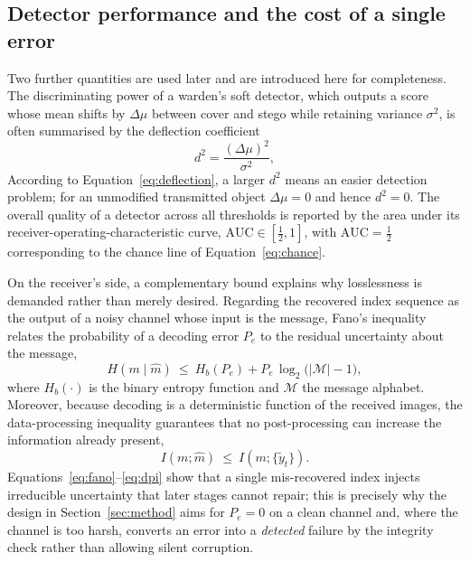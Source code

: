 \documentclass[11pt]{article}
\theoremstyle{definition}
\newcommand{\Eqn}[1]{Equation~\eqref{#1}}
\begin{document}
\subsection{Detector performance and the cost of a single error}\label{sec:detector}
Two further quantities are used later and are introduced here for completeness. The
discriminating power of a warden's soft detector, which outputs a score whose mean
shifts by $\Delta\mu$ between cover and stego while retaining variance $\sigma^2$,
is often summarised by the deflection coefficient
\begin{equation}
  d^2=\frac{(\Delta\mu)^2}{\sigma^2},
  \label{eq:deflection}
\end{equation}
According to \Eqn{eq:deflection}, a larger $d^2$ means an easier detection problem;
for an unmodified transmitted
object $\Delta\mu=0$ and hence $d^2=0$. The overall quality of a detector across all
thresholds is reported by the area under its receiver-operating-characteristic
curve, $\mathrm{AUC}\in[\tfrac12,1]$, with $\mathrm{AUC}=\tfrac12$ corresponding to
the chance line of \Eqn{eq:chance}.

On the receiver's side, a complementary bound explains why losslessness is
demanded rather than merely desired. Regarding the recovered index sequence as the
output of a noisy channel whose input is the message, Fano's inequality relates the
probability of a decoding error $P_e$ to the residual uncertainty about the message,
\begin{equation}
  H\!\left(m \mid \hat m\right)\ \le\ H_b(P_e)+P_e\,\log_2\!\bigl(|\mathcal{M}|-1\bigr),
  \label{eq:fano}
\end{equation}
where $H_b(\cdot)$ is the binary entropy function and $\mathcal{M}$ the message
alphabet. Moreover, because decoding is a deterministic function of the received
images, the data-processing inequality guarantees that no post-processing can
increase the information already present,
\begin{equation}
  I\!\left(m;\hat m\right)\ \le\ I\!\left(m;\{\tilde y_t\}\right).
  \label{eq:dpi}
\end{equation}
Equations~\eqref{eq:fano}--\eqref{eq:dpi} show that a single mis-recovered index
injects irreducible uncertainty that later stages cannot repair; this is precisely
why the design in Section~\ref{sec:method} aims for $P_e=0$ on a clean channel and,
where the channel is too harsh, converts an error into a \emph{detected} failure by
the integrity check rather than allowing silent corruption.
\end{document}
